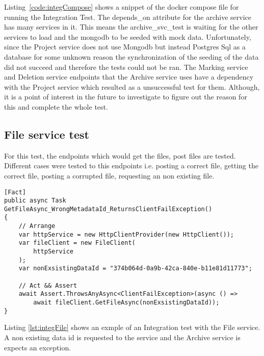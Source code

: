 Listing~\ref{code:integCompose} shows a snippet of the docker compose file for running the Integration Test. The depends\_on attribute for the archive service
has many services in it. This means the archive\_svc\_test is waiting for the other services to load and the mongodb to be seeded with mock data. Unfortunately,
since the Project service does not use Mongodb but instead Postgres Sql as a database for some unknown reason the synchronization of the seeding of the data
did not succeed and therefore the tests could not be ran. The
Marking service and Deletion service endpoints that the Archive service uses have a dependency with the Project service  which resulted as a unsuccessful test
for them. Although, it is a point of interest in the future to investigate to figure out the reason for this and complete the whole test.

\subsection{File service test}
For this test, the endpoints which would get the files, post files are tested. Different cases were tested to this endpoints i.e. posting a correct file,
getting the correct file, posting a corrupted file, requesting an non existing file. 

\begin{lstlisting}[language={[Sharp]C}, caption={Example of Integration test with the file service expecting an exception}, captionpos=b,label={lst:integFile}]
[Fact]
public async Task GetFileAsync_WrongMetadataId_ReturnsClientFailException()
{
    // Arrange
    var httpService = new HttpClientProvider(new HttpClient());
    var fileClient = new FileClient(
        httpService
    );
    var nonExsistingDataId = "374b064d-0a9b-42ca-840e-b11e81d11773";

    // Act && Assert
    await Assert.ThrowsAnyAsync<ClientFailException>(async () =>
        await fileClient.GetFileAsync(nonExsistingDataId));
}
\end{lstlisting} 
Listing \ref{lst:integFile} shows an exmple of an Integration test with the File service. A non existing data id is requested to the service and the Archive service 
is expects an exception. 